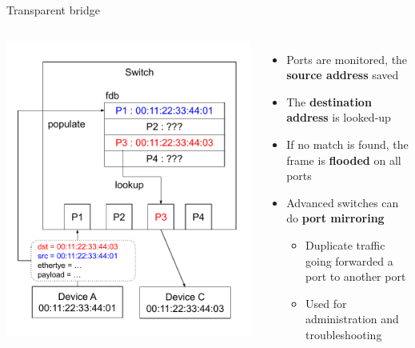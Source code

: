 \begin{frame}{Transparent bridge}
	\begin{columns}
		\includegraphics[width=1.1\textwidth]{slides/networking-stack-overview/transparent_bridge.pdf}
		\begin{itemize}
			\item Ports are monitored, the \textbf{source address} saved
			\item The \textbf{destination address} is looked-up
			\item If no match is found, the frame is \textbf{flooded} on all ports
			\item Advanced switches can do \textbf{port mirroring}
				\begin{itemize}
					\item Duplicate traffic going forwarded a port to another port
					\item Used for administration and troubleshooting
				\end{itemize}
		\end{itemize}
	\end{columns}
\end{frame}

